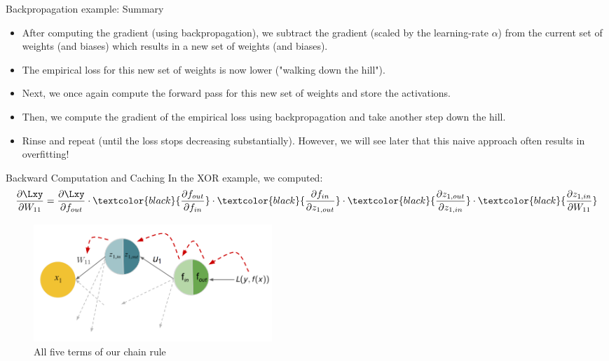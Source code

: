 \begin{frame} {Backpropagation example: Summary}
  \begin{itemize}
    \item After computing the gradient (using backpropagation), we subtract the gradient (scaled by the learning-rate $\alpha$) from the current set of weights (and biases) which results in a new set of weights (and biases).
    \item The empirical loss for this new set of weights is now lower ("walking down the hill").
    \item Next, we once again compute the forward pass for this new set of weights and store the activations.
    \item Then, we compute the gradient of the empirical loss using backpropagation and take another step down the hill.
    \item Rinse and repeat (until the loss stops decreasing substantially). 
      However, we will see later that this naive approach often results in overfitting!
  \end{itemize}
\end{frame}



\begin{frame} {Backward Computation and Caching}
    In the XOR example, we computed:
    $$\frac{\partial \Lxy}{\partial W_{11}} = 
        \frac{\partial \Lxy}{\partial f_{out}} \cdot  \textcolor{black}{\frac{\partial f_{out}}{\partial f_{in}}} \cdot  \textcolor{black}{\frac{\partial f_{in}}{\partial z_{1,out}}} \cdot  \textcolor{black}{\frac{\partial z_{1,out}}{\partial z_{1,in}}} \cdot  \textcolor{black}{\frac{\partial z_{1,in}}{\partial W_{11}}} $$
  \begin{figure}
    \centering
      \includegraphics[width=9cm]{../plots/backprop_gg1_new.png}
      \caption{All five terms of our chain rule}
  \end{figure}
\end{frame}

